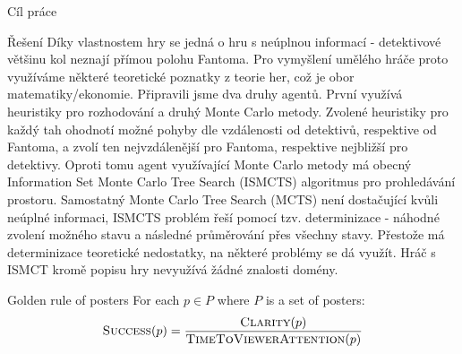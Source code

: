 \documentclass[portrait,a0paper,fontscale=0.25]{baposter}
\begin{document}
\begin{poster}
\begin{posterbox}[column=0, name=goals, below=background]{Cíl práce}
\end{posterbox}

\begin{posterbox}[column=0, name=something1, below=goals]{Řešení}
Díky vlastnostem hry se jedná o hru s neúplnou informací - detektivové většinu kol neznají přímou polohu Fantoma. Pro vymyšlení umělého hráče proto využíváme některé teoretické poznatky z teorie her, což je obor matematiky/ekonomie. 
Připravili jsme dva druhy agentů. První využívá heuristiky pro rozhodování a druhý Monte Carlo metody. Zvolené heuristiky pro každý tah ohodnotí možné pohyby dle vzdálenosti od detektivů, respektive od Fantoma, a zvolí ten nejvzdálenější pro Fantoma, respektive nejbližší pro detektivy. Oproti tomu agent využívající Monte Carlo metody má obecný Information Set Monte Carlo Tree Search (ISMCTS) algoritmus pro prohledávání prostoru. Samostatný Monte Carlo Tree Search (MCTS) není dostačující kvůli neúplné informaci, ISMCTS problém řeší pomocí tzv. determinizace - náhodné zvolení možného stavu a následné průměrování přes všechny stavy. Přestože má determinizace teoretické nedostatky, na některé problémy se dá využít. Hráč s ISMCT kromě popisu hry nevyužívá žádné znalosti domény.





\end{posterbox}

\begin{posterbox}[column=0, name=something2, below=something1, headerColorOne=yellow!80!orange!95!black, boxColorOne=yellow!33]{Golden rule of posters}
For each $p \in P$ where $P$ is a set of posters:
$$ \textsc{Success}(p) = \frac{\textsc{Clarity}(p)}{\textsc{TimeToViewerAttention}(p)} $$
\end{posterbox}


\end{poster}
\end{document}
